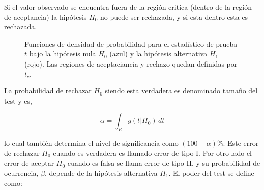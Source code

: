 Si el valor observado se encuentra fuera de la región critica (dentro de la
región de aceptancia) la hipótesis $H_0$ no puede ser rechazada, y si esta
dentro esta es rechazada.

\begin{figure}[h]
  \centering 
  \caption{Funciones de densidad de probabilidad para el estadístico de prueba
    $t$ bajo la hipótesis nula $H_0$ (azul) y la hipótesis alternativa $H_1$
    (rojo). Las regiones de aceptaciancia y rechazo quedan definidas por $t_c$.}
  \label{fig:stat_test}
\end{figure}





La probabilidad de rechazar $H_0$ siendo esta verdadera es denominado tamaño del test y
es,

\begin{equation}
  \alpha = \int_{R} g(t|H_0)\, dt
\end{equation}

lo cual también determina el nivel de significancia como
$(100 - \alpha) \%$. Este error de rechazar $H_0$ cuando es verdadera es llamado
error de tipo I. Por otro lado el error de aceptar $H_0$ cuando es falsa se
llama error de tipo II, y su probabilidad de ocurrencia, $\beta$, depende de la
hipótesis alternativa $H_1$. El poder del test se define como: %

